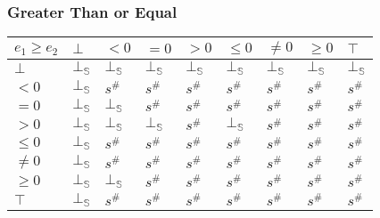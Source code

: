 \documentclass[aspectratio=169]{beamer}
\begin{document}
                                \begin{frame}
                                    \frametitle{Greater Than or Equal}
                \begin{table}
                    \begin{tabular}{|l|l|l|l|l|l|l|l|l|}
                    \hline
                    $e_1 \ge e_2$ & $\bot$ & $<0$   & $=0$   & $>0$   & $\le 0$ & $\ne 0$ & $\ge 0$ & $\top$ \\ \hline
                    $\bot$        & $\bot_\mathbb{S}$ & $\bot_\mathbb{S}$ & $\bot_\mathbb{S}$ & $\bot_\mathbb{S}$ & $\bot_\mathbb{S}$  & $\bot_\mathbb{S}$  & $\bot_\mathbb{S}$  & $\bot_\mathbb{S}$ \\ \hline
                    $<0$          & $\bot_\mathbb{S}$ & $s^\#$ & $s^\#$ & $s^\#$ & $s^\#$  & $s^\#$  & $s^\#$  & $s^\#$ \\ \hline
                    $=0$          & $\bot_\mathbb{S}$ & $\bot_\mathbb{S}$ & $s^\#$ & $s^\#$ & $s^\#$  & $s^\#$  & $s^\#$  & $s^\#$ \\ \hline
                    $>0$          & $\bot_\mathbb{S}$ & $\bot_\mathbb{S}$ & $\bot_\mathbb{S}$ & $s^\#$ & $\bot_\mathbb{S}$  & $s^\#$  & $s^\#$  & $s^\#$ \\ \hline
                    $\le 0$       & $\bot_\mathbb{S}$ & $s^\#$ & $s^\#$ & $s^\#$ & $s^\#$  & $s^\#$  & $s^\#$  & $s^\#$ \\ \hline
                    $\ne 0$       & $\bot_\mathbb{S}$ & $s^\#$ & $s^\#$ & $s^\#$ & $s^\#$  & $s^\#$  & $s^\#$  & $s^\#$ \\ \hline
                    $\ge 0$       & $\bot_\mathbb{S}$ & $\bot_\mathbb{S}$ & $s^\#$ & $s^\#$ & $s^\#$  & $s^\#$  & $s^\#$  & $s^\#$ \\ \hline
                    $\top$        & $\bot_\mathbb{S}$ & $s^\#$ & $s^\#$ & $s^\#$ & $s^\#$  & $s^\#$  & $s^\#$  & $s^\#$ \\ \hline
                    \end{tabular}
                    \end{table}
                \end{frame}
\end{document}
